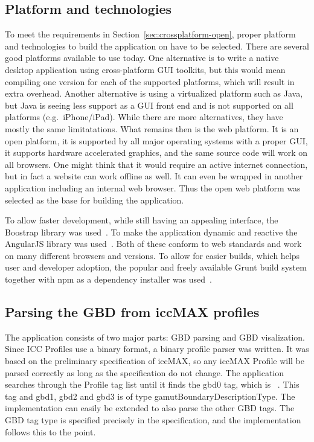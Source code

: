 \subsection{Platform and technologies}
To meet the requirements in Section~\ref{sec:crossplatform-open}, proper platform and technologies to build the application on have to be selected.
There are several good platforms available to use today.
One alternative is to write a native desktop application using cross-platform GUI toolkits, but this would mean compiling one version for each of the supported platforms, which will result in extra overhead.
Another alternative is using a virtualized platform such as Java, but Java is seeing less support as a GUI front end and is not supported on all platforms (e.g.\ iPhone/iPad).
While there are more alternatives, they have mostly the same limitatations.
What remains then is the web platform.
It is an open platform, it is supported by all major operating systems with a proper GUI, it supports hardware accelerated graphics, and the same source code will work on all browsers.
One might think that it would require an active internet connection, but in fact a website can work offline as well.
It can even be wrapped in another application including an internal web browser.
Thus the open web platform was selected as the base for building the application.

To allow faster development, while still having an appealing interface, the Boostrap library was used~\cite{Bootstrap}.
To make the application dynamic and reactive the AngularJS library was used~\cite{Angular}.
Both of these conform to web standards and work on many different browsers and versions.
To allow for easier builds, which helps user and developer adoption, the popular and freely available Grunt build system together with npm as a dependency installer was used~\cite{Grunt,Npm}.

\subsection{Parsing the GBD from iccMAX profiles}
The application consists of two major parts: GBD parsing and GBD visalization.
Since ICC Profiles use a binary format, a binary profile parser was written.
It was based on the preliminary specification of iccMAX, so any iccMAX Profile will be parsed correctly as long as the specification do not change.
The application searches through the Profile tag list until it finds the gbd0 tag, which is ~\cite{IccMaxSpec}.
This tag and gbd1, gbd2 and gbd3 is of type gamutBoundaryDescriptionType.
The implementation can easily be extended to also parse the other GBD tags.
The GBD tag type is specified precisely in the specification, and the implementation follows this to the point.

